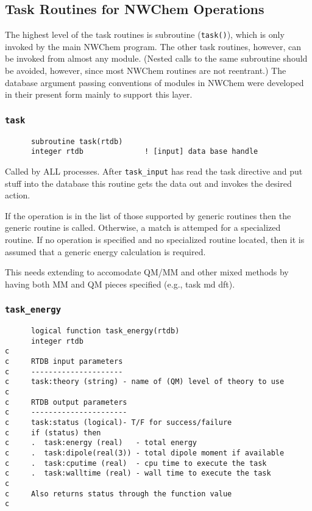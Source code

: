 \subsection{Task Routines for NWChem Operations}

The highest 
level of the task routines is subroutine (\verb+task()+), which
is only invoked by the main NWChem program.
The other task routines, however, can be invoked from almost any module.
(Nested calls to the same subroutine should be avoided, however,
 since most NWChem routines are 
not reentrant.)  The database argument passing conventions of modules in NWChem 
were developed in their
present form mainly 
to support this layer.

\subsubsection{{\tt task}}

\begin{verbatim}
      subroutine task(rtdb)
      integer rtdb              ! [input] data base handle
\end{verbatim}

Called by ALL processes.  After \verb+task_input+ has read the
task directive and put stuff into the database this routine gets the
data out and invokes the desired action.

If the operation is in the list of those supported by generic 
routines then 
the generic routine is called.  Otherwise, a match is attemped 
for a specialized routine.  If no operation is specified 
and no specialized routine located, then it is assumed that
a generic energy calculation is required.

This needs extending to accomodate QM/MM and other mixed methods
by having both MM and QM pieces specified (e.g., task md dft).


\subsubsection{{\tt task\_energy}}


\begin{verbatim}
      logical function task_energy(rtdb)
      integer rtdb
c
c     RTDB input parameters
c     ---------------------
c     task:theory (string) - name of (QM) level of theory to use
c     
c     RTDB output parameters
c     ----------------------
c     task:status (logical)- T/F for success/failure
c     if (status) then
c     .  task:energy (real)   - total energy
c     .  task:dipole(real(3)) - total dipole moment if available
c     .  task:cputime (real)  - cpu time to execute the task
c     .  task:walltime (real) - wall time to execute the task
c
c     Also returns status through the function value
c
\end{verbatim}

